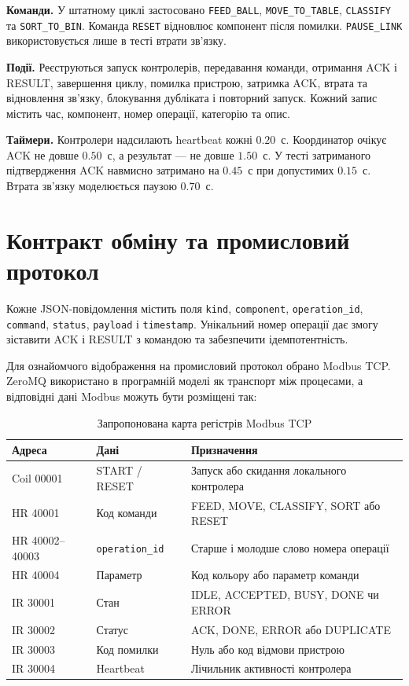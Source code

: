 \documentclass[12pt,a4paper]{article}
\begin{document}
\textbf{Команди.} У штатному циклі застосовано \texttt{FEED\_BALL},
\texttt{MOVE\_TO\_TABLE}, \texttt{CLASSIFY} та
\texttt{SORT\_TO\_BIN}. Команда \texttt{RESET} відновлює компонент після
помилки. \texttt{PAUSE\_LINK} використовується лише в тесті втрати
зв'язку.

\textbf{Події.} Реєструються запуск контролерів, передавання команди,
отримання ACK і RESULT, завершення циклу, помилка пристрою, затримка ACK,
втрата та відновлення зв'язку, блокування дубліката і повторний запуск.
Кожний запис містить час, компонент, номер операції, категорію та опис.

\textbf{Таймери.} Контролери надсилають heartbeat кожні $0.20$~с.
Координатор очікує ACK не довше $0.50$~с, а результат --- не довше
$1.50$~с. У тесті затриманого підтвердження ACK навмисно затримано на
$0.45$~с при допустимих $0.15$~с. Втрата зв'язку моделюється паузою
$0.70$~с.

\section{Контракт обміну та промисловий протокол}
Кожне JSON-повідомлення містить поля \texttt{kind}, \texttt{component},
\texttt{operation\_id}, \texttt{command}, \texttt{status},
\texttt{payload} і \texttt{timestamp}. Унікальний номер операції дає
змогу зіставити ACK і RESULT з командою та забезпечити ідемпотентність.

Для ознайомчого відображення на промисловий протокол обрано Modbus TCP.
ZeroMQ використано в програмній моделі як транспорт між процесами, а
відповідні дані Modbus можуть бути розміщені так:

\begin{table}[H]
\centering\small
\begin{tabularx}{\textwidth}{@{}p{}p{}Y@{}}
\toprule
\textbf{Адреса} & \textbf{Дані} & \textbf{Призначення} \\
\midrule
Coil 00001 & START / RESET & Запуск або скидання локального контролера \\
HR 40001 & Код команди & FEED, MOVE, CLASSIFY, SORT або RESET \\
HR 40002--40003 & \texttt{operation\_id} & Старше і молодше слово номера операції \\
HR 40004 & Параметр & Код кольору або параметр команди \\
IR 30001 & Стан & IDLE, ACCEPTED, BUSY, DONE чи ERROR \\
IR 30002 & Статус & ACK, DONE, ERROR або DUPLICATE \\
IR 30003 & Код помилки & Нуль або код відмови пристрою \\
IR 30004 & Heartbeat & Лічильник активності контролера \\
\bottomrule
\end{tabularx}
\caption{Запропонована карта регістрів Modbus TCP}
\label{tab:modbus}
\end{table}
\end{document}
